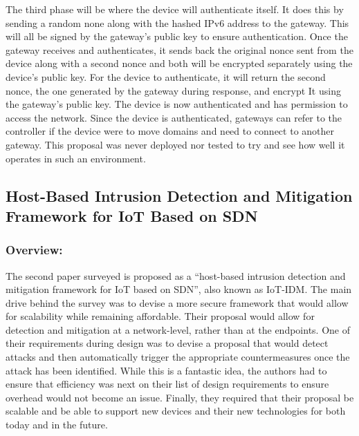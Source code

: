 \smallskip

The third phase will be where the device will authenticate itself. It does this by sending a random none along with the hashed IPv6 address to the gateway. This will all be signed by the gateway’s public key to ensure authentication. Once the gateway receives and authenticates, it sends back the original nonce sent from the device along with a second nonce and both will be encrypted separately using the device’s public key. For the device to authenticate, it will return the second nonce, the one generated by the gateway during response, and encrypt It using the gateway’s public key. The device is now authenticated and has permission to access the network. Since the device is authenticated, gateways can refer to the controller if the device were to move domains and need to connect to another gateway. 
This proposal was never deployed nor tested to try and see how well it operates in such an environment. 

\subsection {Host-Based Intrusion Detection and Mitigation Framework for IoT Based on SDN}
\subsubsection {Overview:}

The second paper surveyed is proposed as a “host-based intrusion detection and mitigation framework for IoT based on SDN”, also known as IoT-IDM. \cite {kalkan2017securing} The main drive behind the survey was to devise a more secure framework that would allow for scalability while remaining affordable. Their proposal would allow for detection and mitigation at a network-level, rather than at the endpoints. One of their requirements during design was to devise a proposal that would detect attacks and then automatically trigger the appropriate countermeasures once the attack has been identified. While this is a fantastic idea, the authors had to ensure that efficiency was next on their list of design requirements to ensure overhead would not become an issue. Finally, they required that their proposal be scalable and be able to support new devices and their new technologies for both today and in the future.

